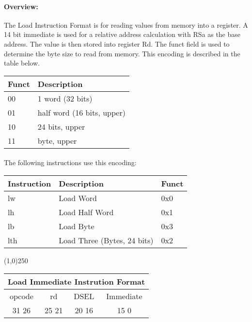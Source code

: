 \documentclass[letterpaper, 11pt]{article}
\begin{document}
\paragraph{Overview:}The Load Instruction Format is for reading values from memory into a register. A 14 bit immediate is used
for a relative address calculation with RSa as the base address. The value is then stored into register Rd. The funct field is used
to determine the byte size to read from memory. This encoding is described in the table below. \\
\begin{tabular}{l|l}
		Funct & Description \\ \hline
		00	  & 1 word (32 bits) \\
		01	  & half word (16 bits, upper) \\ 
		10	  & 24 bits, upper \\
		11	  & byte, upper		\\
		\end{tabular}
\paragraph{}The following instructions use this encoding: \\
\begin{center}
	\begin{tabular}{|l|l|l|} \hline
			Instruction & Description 						& Funct\\ \hline
			lw			& Load Word							& 0x0 \\ \hline
			lh			& Load Half Word					& 0x1 \\ \hline
			lb			& Load Byte							& 0x3 \\ \hline
			lth			& Load Three (Bytes, 24 bits)		& 0x2 \\ \hline

\end{tabular}
\end{center}
\begin{center}
	\line(1,0){250}
\end{center}

\begin{center}
		\begin{tabular}{|c|c|c|c|}
				\multicolumn{4}{c}{Load Immediate Instrution Format}\\ \hline
				\hspace{2pt} opcode \hspace{2pt} & \hspace{5pt} rd \hspace{5pt} &  \hspace{4pt} DSEL \hspace{4pt} & \hspace{10pt}Immediate  \hspace{10pt}   \\	\hline
			31 \hfill 26& 25 \hfill 21 &20 \hfill  16& 15  \hfill   0\\ \hline
		
	\end{tabular}
\end{center}
\end{document}
